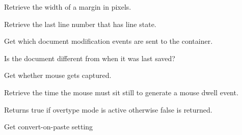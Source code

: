 \label{wxstyledtextctrlgetmarginwidth}


Retrieve the width of a margin in pixels.


\label{wxstyledtextctrlgetmaxlinestate}


Retrieve the last line number that has line state.


\label{wxstyledtextctrlgetmodeventmask}


Get which document modification events are sent to the container.


\label{wxstyledtextctrlgetmodify}


Is the document different from when it was last saved?


\label{wxstyledtextctrlgetmousedowncaptures}


Get whether mouse gets captured.


\label{wxstyledtextctrlgetmousedwelltime}


Retrieve the time the mouse must sit still to generate a mouse dwell event.


\label{wxstyledtextctrlgetovertype}


Returns true if overtype mode is active otherwise false is returned.


\label{wxstyledtextctrlgetpasteconvertendings}


Get convert-on-paste setting


\label{wxstyledtextctrlgetprintcolourmode}


